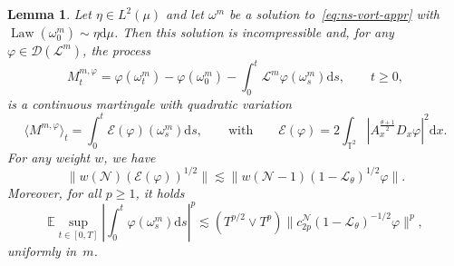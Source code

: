 \documentclass{article}
\newcommand{\mathd}{\mathrm{d}}
\newcommand{\tmop}[1]{\ensuremath{\operatorname{#1}}}
\newtheorem{lemma}{Lemma}
\begin{document}
\begin{lemma}
  \label{lemma:galerkin-estimates}Let $\eta \in L^2 (\mu)$ and let $\omega^m$
  be a solution to~{\eqref{eq:ns-vort-appr}} with $\tmop{Law} (\omega^m_0)
  \sim \eta \mathd \mu$. Then this solution is incompressible and, for any
  $\varphi \in \mathcal{D} (\mathcal{L}^m)$, the process
  \[ M_t^{m, \varphi} = \varphi (\omega^m_t) - \varphi (\omega^m_0) - \int_0^t
     \mathcal{L}^m \varphi (\omega_s^m) \mathd s, \qquad t \geqslant 0,
     \label{eq:mart-prob-m} \]
  is a continuous martingale with quadratic variation
  \begin{equation}
    \langle M^{m, \varphi} \rangle_t = \int_0^t \mathcal{E} (\varphi)
    (\omega^m_s) \mathd s, \qquad \text{with} \qquad \mathcal{E} (\varphi) = 2
    \int_{\mathbb{T}^2} |A^{\frac{\theta + 1}{2}}_x D_x \varphi |^2 \mathd x.
    \label{eq:mart-qvar}
  \end{equation}
  For any weight $w$, we have
  \begin{equation}
    \| w (\mathcal{N}) (\mathcal{E} (\varphi))^{1 / 2} \| \lesssim \| w
    (\mathcal{N}- 1) (1 -\mathcal{L}_{\theta})^{1 / 2} \varphi \| .
    \label{eq:energy-norm}
  \end{equation}
  Moreover, for all $p \geqslant 1$, it holds
  \begin{equation}
    \mathbb{E} \sup_{t \in [0, T]} \left| \int_0^t \varphi (\omega_s^m) \mathd
    s \right|^p \lesssim (T^{p / 2} \vee T^p) \| c_{2 p}^{\mathcal{N}} (1
    -\mathcal{L}_{\theta})^{- 1 / 2} \varphi \|^p, \label{eq:ito-trick-m}
  \end{equation}
  uniformly in~$m$.
\end{lemma}
\end{document}
